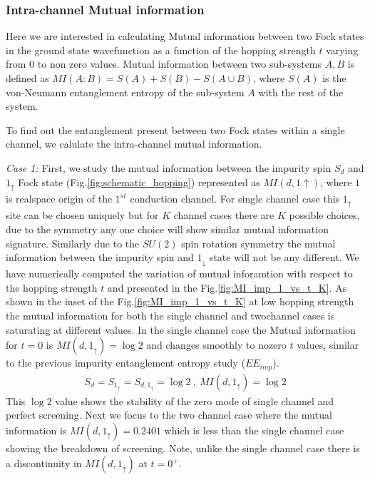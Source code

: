 \documentclass[reprint,prb,superscriptaddress]{revtex4-2}
\begin{document}
\subsubsection{Intra-channel Mutual information}

\noindent Here we are interested in calculating Mutual information between two Fock states in the ground state wavefunction as a function of the hopping strength $t$ varying from $0$ to non zero values. Mutual information between two sub-systems $A,B$ is defined as $MI(A:B)=S(A)+S(B)-S(A\cup B)$, where $S(A)$ is the von-Neumann entanglement entropy of the sub-system $A$ with the rest of the system. 

\noindent To find out the entanglement present between two Fock states within a single channel, we calulate the intra-channel mutual information.

\par \textit{Case 1:} First, we study the mutual information between the impurity spin $S_d$ and $1_\uparrow$ Fock state (Fig.\ref{fig:schematic_hopping}) represented as $MI(d,1\uparrow)$, where $1$ is realspace origin of the $1^{st}$ conduction channel. For single channel case this $1_{\uparrow}$ site can be chosen uniquely but for $K$ channel cases there are $K$ possible choices, due to the symmetry any one choice will show similar mutual information signature. Similarly due to the $SU(2)$ spin rotation symmetry the mutual information between the impurity spin and $1_{\downarrow}$ state will not be any different. We have numerically computed the variation of mutual inforamtion with respect to the hopping strength $t$ and presented in the Fig.\ref{fig:MI_imp_1_vs_t_K}.  As shown in the inset of the Fig.\ref{fig:MI_imp_1_vs_t_K} at low hopping strength the mutual information for both the single channel and twochannel cases is saturating at different values. In the single channel case the Mutual information for $t=0$ is $MI(d,1_{\uparrow})=\log 2$ and changes smoothly to nozero $t$ values, similar to the previous impurity entanglement entropy study ($EE_{imp}$).
\begin{eqnarray}
S_{d}=S_{1_{\uparrow}}=S_{d,1_{\uparrow}}=\log 2~,~MI(d,1_{\uparrow})=\log 2
\end{eqnarray}
This $\log 2$ value shows the stability of the zero mode of single channel and perfect screening. Next we focus to the two channel case where the mutual information is $MI(d,1_{\uparrow})=0.2401$ which is less than the single channel case showing the breakdown of screening. Note, unlike the single channel case there is a discontinuity in $MI(d,1_{\uparrow})$ at $t=0^+$.
\end{document}
